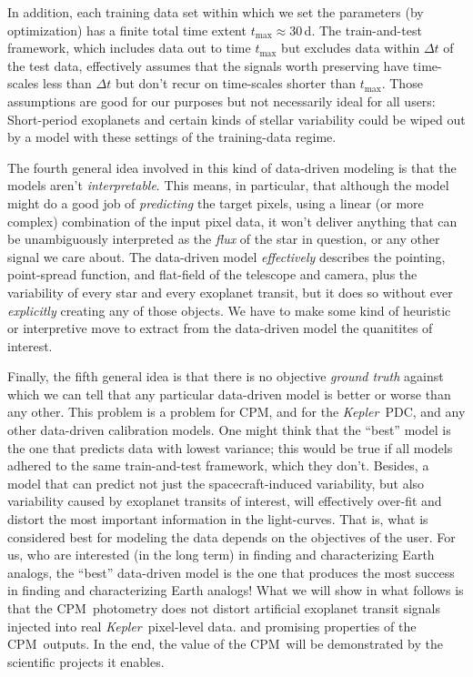 \documentclass[12pt, preprint]{aastex}
\newcommand{\project}[1]{\textsl{#1}}
\newcommand{\Kepler}{\project{Kepler}}
\newcommand{\name}{CPM}
\begin{document}
In addition, each training data set within which we set the parameters (by optimization) has a finite total time extent $t_{\max}\approx 30$\,d.
The train-and-test framework, which includes data out to time $t_{\max}$ but excludes data within $\Delta t$ of the test data,
  effectively assumes that the signals worth preserving have time-scales less than $\Delta t$ but don't recur on time-scales
  shorter than $t_{\max}$.
Those assumptions are good for our purposes but not necessarily ideal for all users:
Short-period exoplanets and certain kinds of stellar variability
  could be wiped out by a model with these settings of the training-data regime.

The fourth general idea involved in this kind of data-driven modeling is that the models aren't \emph{interpretable}.
This means, in particular, that although the model might do a good job of \emph{predicting} the target pixels,
  using a linear (or more complex) combination of the input pixel data,
  it won't deliver anything that can be unambiguously interpreted as the \emph{flux} of the star in question,
  or any other signal we care about.
The data-driven model \emph{effectively} describes the pointing, point-spread function, and flat-field
  of the telescope and camera,
  plus the variability of every star and every exoplanet transit,
  but it does so without ever \emph{explicitly} creating any of those objects.
We have to make some kind of heuristic or interpretive move to extract from the data-driven model the quanitites of interest.

Finally, the fifth general idea is that there is no objective \emph{ground truth} against which we can tell
  that any particular data-driven model is better or worse than any other.
This problem is a problem for \name, and for the \Kepler\ PDC, and any other data-driven calibration models.
One might think that the ``best'' model is the one that predicts data with lowest variance;
  this would be true if all models adhered to the same train-and-test framework, which they don't.
Besides, a model that can predict not just the spacecraft-induced variability,
  but also variability caused by exoplanet transits of interest,
  will effectively over-fit and distort the most important information in the light-curves.
That is, what is considered best for modeling the data depends on the objectives of the user.
For us, who are interested (in the long term) in finding and characterizing Earth analogs,
  the ``best'' data-driven model is the one that produces the most success in finding and characterizing Earth analogs!
What we will show in what follows is that the \name\ photometry does not distort
  artificial exoplanet transit signals injected into real \Kepler\ pixel-level data.
  and promising properties of the \name\ outputs.
In the end, the value of the \name\ will be demonstrated by the scientific projects it enables.
\end{document}

